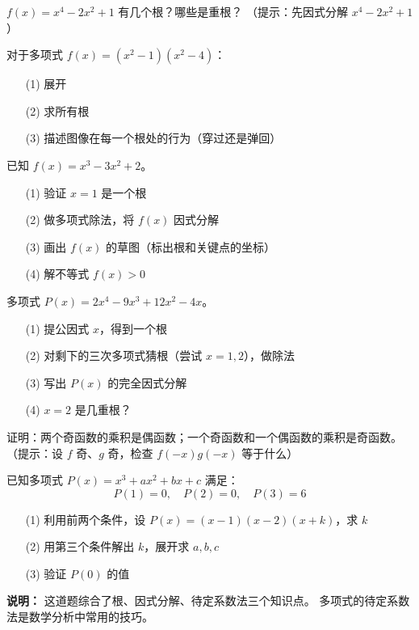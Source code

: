 \begin{exercise}[5]
\(f(x) = x^4 - 2x^2 + 1\) 有几个根？哪些是重根？
（提示：先因式分解 \(x^4 - 2x^2 + 1\)）
\end{exercise}

\begin{exercise}[5]
对于多项式 \(f(x) = (x^2 - 1)(x^2 - 4)\)：
\begin{enumerate}
  \item[(1)] 展开
  \item[(2)] 求所有根
  \item[(3)] 描述图像在每一个根处的行为（穿过还是弹回）
\end{enumerate}
\end{exercise}


\begin{exercise}[6]
已知 \(f(x) = x^3 - 3x^2 + 2\)。
\begin{enumerate}
  \item[(1)] 验证 \(x=1\) 是一个根
  \item[(2)] 做多项式除法，将 \(f(x)\) 因式分解
  \item[(3)] 画出 \(f(x)\) 的草图（标出根和关键点的坐标）
  \item[(4)] 解不等式 \(f(x) > 0\)
\end{enumerate}
\end{exercise}

\begin{exercise}[6]
多项式 \(P(x) = 2x^4 - 9x^3 + 12x^2 - 4x\)。
\begin{enumerate}
  \item[(1)] 提公因式 \(x\)，得到一个根
  \item[(2)] 对剩下的三次多项式猜根（尝试 \(x=1,2\)），做除法
  \item[(3)] 写出 \(P(x)\) 的完全因式分解
  \item[(4)] \(x=2\) 是几重根？
\end{enumerate}
\end{exercise}

\begin{exercise}[6]
证明：两个奇函数的乘积是偶函数；一个奇函数和一个偶函数的乘积是奇函数。
（提示：设 \(f\) 奇、\(g\) 奇，检查 \(f(-x)g(-x)\) 等于什么）
\end{exercise}


\begin{exercise}[7]
已知多项式 \(P(x) = x^3 + ax^2 + bx + c\) 满足：
\[
P(1) = 0,\quad P(2) = 0,\quad P(3) = 6
\]
\begin{enumerate}
  \item[(1)] 利用前两个条件，设 \(P(x) = (x-1)(x-2)(x+k)\)，求 \(k\)
  \item[(2)] 用第三个条件解出 \(k\)，展开求 \(a,b,c\)
  \item[(3)] 验证 \(P(0)\) 的值
\end{enumerate}

\textbf{说明：} 这道题综合了根、因式分解、待定系数法三个知识点。
多项式的待定系数法是数学分析中常用的技巧。
\end{exercise}

